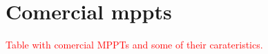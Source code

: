 \section{Comercial \acs{mppt}s}

\textcolor{red}{Table with comercial MPPTs and some of their carateristics.}




